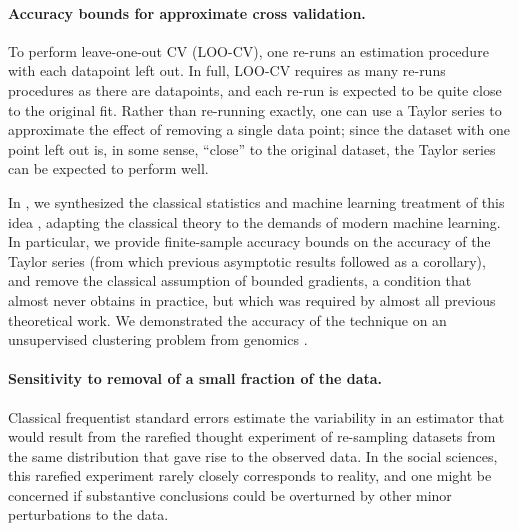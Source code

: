 
\paragraph{Accuracy bounds for approximate cross validation.}

To perform leave-one-out CV (LOO-CV), one re-runs an estimation procedure with
each datapoint left out.  In full, LOO-CV requires as many re-runs procedures as
there are datapoints, and each re-run is expected to be quite close to the
original fit.  Rather than re-running exactly, one can use a Taylor series to
approximate the effect of removing a single data point; since the dataset with
one point left out is, in some sense, ``close'' to the original dataset, the
Taylor series can be expected to perform well.

In \citet{giordano:2019:ij}, we synthesized the classical statistics and machine
learning treatment of this idea \citep{jaeckel:1972:infinitesimal,
shao:2012:jackknife, rad:2018:scalableloo, koh:2017:blackbox}, adapting the
classical theory to the demands of modern machine learning.  In particular, we
provide finite-sample accuracy bounds on the accuracy of the Taylor series (from
which previous asymptotic results followed as a corollary), and remove the
classical assumption of bounded gradients, a condition that almost never obtains
in practice, but which was required by almost all previous theoretical work. We
demonstrated the accuracy of the technique on an unsupervised clustering problem
from genomics \citep{shoemaker:2015:ultrasensitive}.


\paragraph{Sensitivity to removal of a small fraction of the data.} Classical
frequentist standard errors estimate the variability in an estimator that would
result from the rarefied thought experiment of re-sampling datasets from the same
distribution that gave rise to the observed data.  In the social sciences, this
rarefied experiment rarely closely corresponds to reality, and one might be
concerned if substantive conclusions could be overturned by other minor
perturbations to the data.

